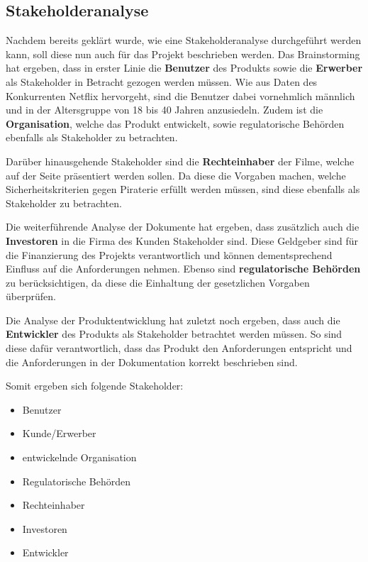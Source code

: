 \subsection{Stakeholderanalyse}
Nachdem bereits geklärt wurde, wie eine Stakeholderanalyse durchgeführt werden kann, soll diese nun auch für das Projekt beschrieben werden.
Das Brainstorming hat ergeben, dass in erster Linie die \textbf{Benutzer} des Produkts sowie die \textbf{Erwerber} als Stakeholder in Betracht gezogen werden müssen.
Wie aus Daten des Konkurrenten Netflix hervorgeht, sind die Benutzer dabei vornehmlich männlich\autocite[vgl.][]{Ailon.a} und in der Altersgruppe von 18 bis 40 Jahren anzusiedeln\autocite[vgl.][]{Ailon.b}.
Zudem ist die \textbf{Organisation}, welche das Produkt entwickelt, sowie regulatorische Behörden ebenfalls als Stakeholder zu betrachten.

Darüber hinausgehende Stakeholder sind die \textbf{Rechteinhaber} der Filme, welche auf der Seite präsentiert werden sollen.
Da diese die Vorgaben machen, welche Sicherheitskriterien gegen Piraterie erfüllt werden müssen, sind diese ebenfalls als Stakeholder zu betrachten.

Die weiterführende Analyse der Dokumente hat ergeben, dass zusätzlich auch die \textbf{Investoren} in die Firma des Kunden Stakeholder sind.
Diese Geldgeber sind für die Finanzierung des Projekts verantwortlich und können dementsprechend Einfluss auf die Anforderungen nehmen.
Ebenso sind \textbf{regulatorische Behörden} zu berücksichtigen, da diese die Einhaltung der gesetzlichen Vorgaben überprüfen.

Die Analyse der Produktentwicklung hat zuletzt noch ergeben, dass auch die \textbf{Entwickler} des Produkts als Stakeholder betrachtet werden müssen.
So sind diese dafür verantwortlich, dass das Produkt den Anforderungen entspricht und die Anforderungen in der Dokumentation korrekt beschrieben sind.

Somit ergeben sich folgende Stakeholder:
\begin{itemize}
    \item Benutzer
    \item Kunde/Erwerber
    \item entwickelnde Organisation
    \item Regulatorische Behörden
    \item Rechteinhaber
    \item Investoren
    \item Entwickler
\end{itemize}

